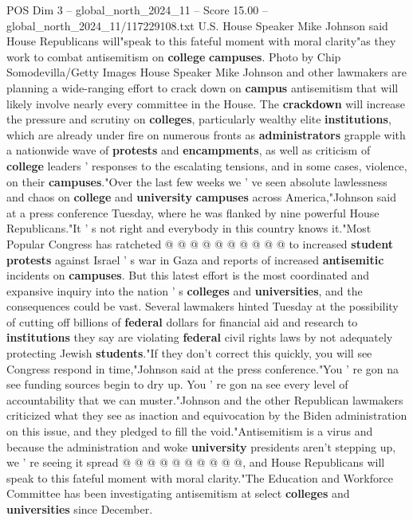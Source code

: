 \begin{textsample}{POS Dim 3 – global\_north\_2024\_11 – Score 15.00 – global\_north\_2024\_11/117229108.txt}  \label{ex:f3_pos_184}
U.S.
House Speaker Mike Johnson said House Republicans will"speak to this fateful moment with moral clarity"as they work to combat antisemitism on \textbf{college} \textbf{campuses}.
Photo by Chip Somodevilla/Getty Images House Speaker Mike Johnson and other lawmakers are planning a wide-ranging effort to crack down on \textbf{campus} antisemitism that will likely involve nearly every committee in the House.
The \textbf{crackdown} will increase the pressure and scrutiny on \textbf{colleges}, particularly wealthy elite \textbf{institutions}, which are already under fire on numerous fronts as \textbf{administrators} grapple with a nationwide wave of \textbf{protests} and \textbf{encampments}, as well as criticism of \textbf{college} leaders ' responses to the escalating tensions, and in some cases, violence, on their \textbf{campuses}."Over the last few weeks we ' ve seen absolute lawlessness and chaos on \textbf{college} and \textbf{university} \textbf{campuses} across America,"Johnson said at a press conference Tuesday, where he was flanked by nine powerful House Republicans."It ' s not right and everybody in this country knows it."Most Popular Congress has ratcheted @ @ @ @ @ @ @ @ @ @ to increased \textbf{student} \textbf{protests} against Israel ' s war in Gaza and reports of increased \textbf{antisemitic} incidents on \textbf{campuses}.
But this latest effort is the most coordinated and expansive inquiry into the nation ' s \textbf{colleges} and \textbf{universities}, and the consequences could be vast.
Several lawmakers hinted Tuesday at the possibility of cutting off billions of \textbf{federal} dollars for financial aid and research to \textbf{institutions} they say are violating \textbf{federal} civil rights laws by not adequately protecting Jewish \textbf{students}."If they don't correct this quickly, you will see Congress respond in time,"Johnson said at the press conference."You ' re gon na see funding sources begin to dry up.
You ' re gon na see every level of accountability that we can muster."Johnson and the other Republican lawmakers criticized what they see as inaction and equivocation by the Biden administration on this issue, and they pledged to fill the void."Antisemitism is a virus and because the administration and woke \textbf{university} presidents aren't stepping up, we ' re seeing it spread @ @ @ @ @ @ @ @ @ @, and House Republicans will speak to this fateful moment with moral clarity."The Education and Workforce Committee has been investigating antisemitism at select \textbf{colleges} and \textbf{universities} since December.

\end{textsample}
